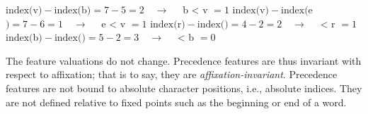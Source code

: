\begin{exe}
    \ex \begin{xlist}
	\ex $\text{index}($\textsf{v}$) - \text{index}($\textsf{b}$) = 7 - 5 = 2 \quad\to\quad $ \textsf{b < v} $ =1 $
	\ex $\text{index}($\textsf{v}$) - \text{index}($\textsf{e}$) = 7 - 6 = 1 \quad\to\quad $ \textsf{e < v} $ =1 $
	\ex $\text{index}($\textsf{r}$) - \text{index}($\textsf{\textrevglotstop}$) = 4 - 2 = 2 \quad\to\quad $\textsf{ < r} $ =1 $
	\ex $\text{index}($\textsf{b}$) - \text{index}($\textsf{\textrevglotstop}$) = 5 - 2 = 3 \quad\to\quad $ \textsf{ < b} $ =0 $ 
    \end{xlist}
\end{exe}


The feature valuations do not change.
Precedence features are thus invariant with respect to affixation; that is to say, 
they are \emph{affixation-invariant}.
Precedence features are not bound to absolute character positions, i.e., 
absolute indices. They are not defined relative to fixed points such as 
the beginning or end of a word.

